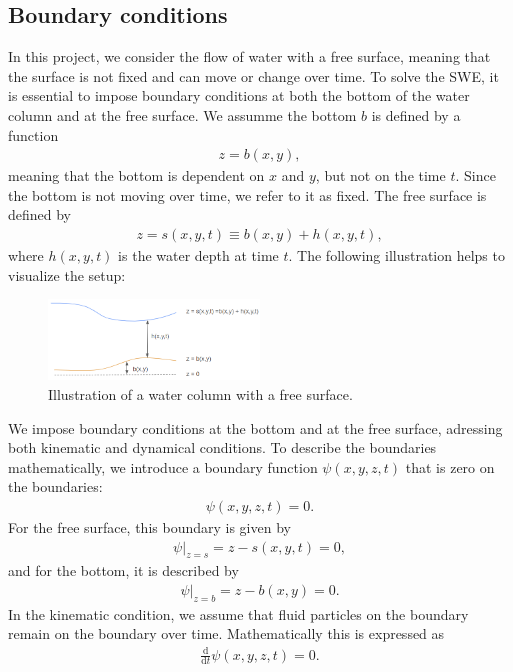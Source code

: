 \subsection{Boundary conditions}
In this project, we consider the flow of water with a free surface, meaning that the surface is not fixed and can move or change over time.
To solve the SWE, it is essential to impose boundary conditions at both the bottom of the water column and at the free surface.
We assumme the bottom $b$ is defined by a function
\begin{align*}
    z = b(x,y),
\end{align*}
meaning that the bottom is dependent on $x$ and $y$, but not on the time $t$.
Since the bottom is not moving over time, we refer to it as fixed.
The free surface is defined by 
\begin{align*}
    z = s(x,y,t) \equiv b(x,y) + h(x,y,t),
\end{align*}
where $h(x,y,t)$ is the water depth at time $t$.
The following illustration helps to visualize the setup:
\begin{figure}[H]
    \centering
    \includegraphics[width=0.5\textwidth]{figs/water-column-bc.png}
    \caption{Illustration of a water column with a free surface.}\label{fig:water_column_bc}
\end{figure}
We impose boundary conditions at the bottom and at the free surface, adressing both kinematic and dynamical conditions.
To describe the boundaries mathematically, we introduce a boundary function $\psi(x,y,z,t)$ that is zero on the boundaries:
\begin{align*}
    \psi(x,y,z,t) = 0.
\end{align*}
For the free surface, this boundary is given by
\begin{align}\label{eq:psi_free_surface}
    \psi|_{z = s} = z - s(x,y,t) = 0,
\end{align}
and for the bottom, it is described by
\begin{align}\label{eq:psi_bottom}
    \psi|_{z = b} = z - b(x,y) = 0.
\end{align}
In the kinematic condition, we assume that fluid particles on the boundary remain on the boundary over time.
Mathematically this is expressed as
\begin{align*}
    \frac{\text{d} }{\text{d} t} \psi(x,y,z,t) = 0.
\end{align*}
